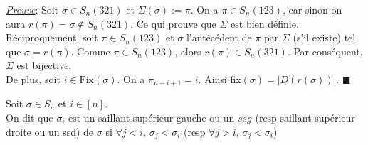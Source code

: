 \underline{\textit{Preuve}}:
Soit $\sigma \in S_{n}(321)$ et $\Sigma(\sigma):=\pi$. On a $\pi \in S_{n}(123)$, car sinon on aura $r(\pi)=\sigma \notin S_{n}(321)$.
Ce qui prouve que $\Sigma$ est bien définie.\\
Réciproquement, soit $\pi \in S_{n}(123)$ et $\sigma$ l'antécédent de $\pi$ par $\Sigma$ (s'il existe) tel que $\sigma=r(\pi)$. Comme $\pi \in S_{n}(123)$, alors $r(\pi) \in S_{n}(321)$. Par conséquent, $\Sigma$ est bijective.\\
De plus, soit $i\in \text{Fix}(\sigma)$. On a $\pi_{n-i+1}=i$. Ainsi fix$(\sigma)=|D(r(\sigma))|$. $\blacksquare$

\begin{definition}
	\begin{rm}
		Soit $\sigma\in S_{n}$ et  $i\in [n]$.\\
		On dit que $\sigma_{i}$ est un saillant supérieur gauche ou un $ssg$ (resp saillant
		supérieur droite ou un ssd)  de $\sigma$ si $\forall j<i\text{, }\sigma_{j}<\sigma_{i}$
		(resp $\forall j>i$, $\sigma_{j}<\sigma_{i}$)
	\end{rm}
\end{definition}

